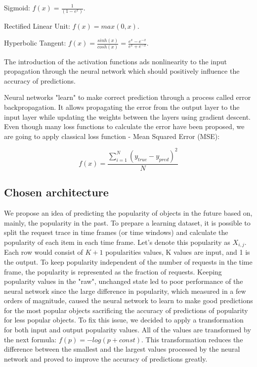 \vspace{4pt}
Sigmoid: \Large $ f(x) = \frac{1}{(1 - e^x)} $.
\normalsize
\vspace{4pt}

Rectified Linear Unit: $ f(x) = max(0, x) $.

Hyperbolic Tangent: \Large $ f(x) = \frac{sinh(x)}{cosh(x)} = \frac{e^x - e^{-x}}{e^x + e^{-x}}$.

\normalsize
\vspace{4pt}
The introduction of the activation functions ads nonlinearity to the input propagation through the neural network which should positively influence the accuracy of predictions.

Neural networks "learn" to make correct prediction through a process called error backpropagation\cite{13}. It allows propagating the error from the output layer to the input layer while updating the weights between the layers using gradient descent. Even though many loss functions to calculate the error have been proposed, we are going to apply classical loss function - Mean Squared Error (MSE):

\Large
$$ f(x) = \frac{\sum_{i=1}^{N} (y_{true} - y_{pred})^2}{N} $$
\normalsize

\subsection{Chosen architecture} \label{chosen_architecture}

We propose an idea of predicting the popularity of objects in the future based on, mainly, the popularity in the past. To prepare a learning dataset, it is possible to split the request trace in time frames (or time windows) and calculate the popularity of each item in each time frame. Let’s denote this popularity as $ X_{i,j} $. Each row would consist of $ K + 1 $ popularities values, K values are input, and 1 is the output. To keep popularity independent of the number of requests in the time frame, the popularity is represented as the fraction of requests. Keeping popularity values in the "raw", unchanged state led to poor performance of the neural network since the large difference in popularity, which measured in a few orders of magnitude, caused the neural network to learn to make good predictions for the most popular objects sacrificing the accuracy of predictions of popularity for less popular objects. To fix this issue, we decided to apply a transformation for both input and output popularity values. All of the values are transformed by the next formula: $ f(p) = -log(p + const) $. This transformation reduces the difference between the smallest and the largest values processed by the neural network and proved to improve the accuracy of predictions greatly.

